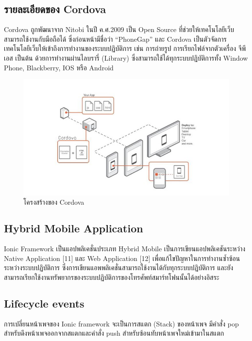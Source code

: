 	\subsection{รายละเอียดของ Cordova}
		Cordova ถูกพัฒนาจาก Nitobi ในปี ค.ศ.2009 เป็น Open Source ที่ช่วยให้เทคโนโลยีเว็บสามารถใช้งานกับมือถือได้ ซึ่งก่อนหน้ามีชื่อว่า “PhoneGap” และ Cordova เป็นตัวจัดการเทคโนโลยีเว็บให้เข้าถึงการทำงานของระบบปฏิบัติการ เช่น การถ่ายรูป การเรียกไฟล์จากตัวเครื่อง จีพีเอส เป็นต้น ด้วยการทำงานผ่านไลบรารี่ (Library) ซึ่งสามารถใช้ได้ทุกระบบปฏิบัติการทั้ง Window Phone, Blackberry, IOS หรือ Android 

		\begin{figure}[H]
			\includegraphics[width=\columnwidth]{Figures/2/cordova-structrue}
			\caption{โครงสร้างของ Cordova}
			\label{Fig:cordova-structrue}
		\end{figure}

	\subsection{Hybrid Mobile Application }
		Ionic Framework เป็นแอปพลิเคชั่นประเภท Hybrid Mobile เป็นการเขียนแอปพลิเคชันระหว่าง Native Application [11] และ Web Application [12] เพื่อแก้ไขปัญหาในการทำงานซ้ำซ้อนระหว่างระบบปฏิบัติการ ซึ่งการเขียนแอพพลิเคชั่นสามารถใช้งานได้กับทุกระบบปฏิบัติการ และยังสามารถเรียกใช้งานทรัพยากรของระบบปฏิบัติการของโทรศัพท์สมาร์ทโฟนนั้นได้อย่างอิสระ

	\subsection{Lifecycle events }
		การเปลี่ยนหน้าเพจของ Ionic framework จะเป็นการสแตก (Stack) ของหน้าเพจ มีคำสั่ง pop สำหรับดึงหน้าเพจออกจากสแตกและคำสั่ง push สำหรับซ้อนทับหน้าเพจใหม่เข้ามาในสแตก
		
